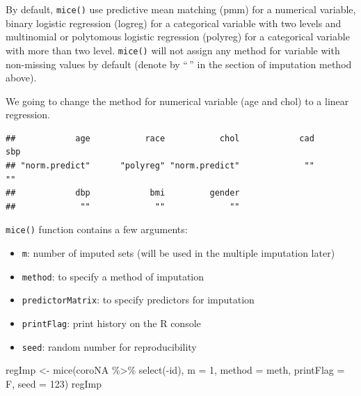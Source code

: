 \documentclass[
  10pt,
]{krantz}
\newenvironment{Shaded}{\begin{snugshade}}{\end{snugshade}}
\newcommand{\AttributeTok}[1]{\textcolor[rgb]{0.77,0.63,0.00}{#1}}
\newcommand{\DecValTok}[1]{\textcolor[rgb]{0.00,0.00,0.81}{#1}}
\newcommand{\FunctionTok}[1]{\textcolor[rgb]{0.00,0.00,0.00}{#1}}
\newcommand{\NormalTok}[1]{#1}
\newcommand{\OtherTok}[1]{\textcolor[rgb]{0.56,0.35,0.01}{#1}}
\newcommand{\SpecialCharTok}[1]{\textcolor[rgb]{0.00,0.00,0.00}{#1}}
\newcommand{\StringTok}[1]{\textcolor[rgb]{0.31,0.60,0.02}{#1}}
\providecommand{\tightlist}{%
  \setlength{\itemsep}{0pt}\setlength{\parskip}{0pt}}
\begin{document}
By default, \texttt{mice()} use predictive mean matching (pmm) for a numerical variable, binary logistic regression (logreg) for a categorical variable with two levels and multinomial or polytomous logistic regression (polyreg) for a categorical variable with more than two level. \texttt{mice()} will not assign any method for variable with non-missing values by default (denote by ``\,'' in the section of imputation method above).

We going to change the method for numerical variable (age and chol) to a linear regression.

\begin{Shaded}
\end{Shaded}

\begin{verbatim}
##            age           race           chol            cad            sbp 
## "norm.predict"      "polyreg" "norm.predict"             ""             "" 
##            dbp            bmi         gender 
##             ""             ""             ""
\end{verbatim}

\texttt{mice()} function contains a few arguments:

\begin{itemize}
\tightlist
\item
  \texttt{m}: number of imputed sets (will be used in the multiple imputation later)
\item
  \texttt{method}: to specify a method of imputation
\item
  \texttt{predictorMatrix}: to specify predictors for imputation
\item
  \texttt{printFlag}: print history on the R console
\item
  \texttt{seed}: random number for reproducibility
\end{itemize}

\begin{Shaded}
\begin{Highlighting}[]
\NormalTok{regImp }\OtherTok{\textless{}{-}} \FunctionTok{mice}\NormalTok{(coroNA }\SpecialCharTok{\%\textgreater{}\%} \FunctionTok{select}\NormalTok{(}\SpecialCharTok{{-}}\NormalTok{id), }
               \AttributeTok{m =} \DecValTok{1}\NormalTok{, }\AttributeTok{method =}\NormalTok{ meth, }\AttributeTok{printFlag =}\NormalTok{ F, }\AttributeTok{seed =} \DecValTok{123}\NormalTok{)}
\NormalTok{regImp}
\end{Highlighting}
\end{Shaded}
\end{document}
